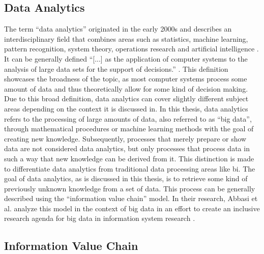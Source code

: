 \subsection{Data Analytics}

The term \enquote{data analytics} originated in the early 2000s and describes an interdisciplinary field that combines areas such as statistics, machine learning, pattern recognition, system theory, operations research and artificial intelligence \parencite{Runkler.2020}. It can be generally defined \enquote{[...] as the application of computer systems to the analysis of large data sets for the support of decisions.} \parencite{Runkler.2020}. This definition showcases the broadness of the topic, as most computer systems process some amount of data and thus theoretically allow for some kind of decision making. Due to this broad definition, data analytics can cover slightly different subject areas depending on the context it is discussed in. In this thesis, data analytics refers to the processing of large amounts of data, also referred to as \enquote{big data}, through mathematical procedures or machine learning methods with the goal of creating new knowledge. Subsequently, processes that merely prepare or show data are not considered data analytics, but only processes that process data in such a way that new knowledge can be derived from it. This distinction is made to differentiate data analytics from traditional data processing areas like \ac{bi}. The goal of data analytics, as is discussed in this thesis, is to retrieve some kind of previously unknown knowledge from a set of data. This process can be generally described using the \enquote{information value chain} model. In their research, Abbasi et al. analyze this model in the context of big data in an effort to create an inclusive research agenda for big data in information system research \parencite{Abbasi.2016}.

\subsection{Information Value Chain}
\label{subsec:informationValueChainSubSection}

